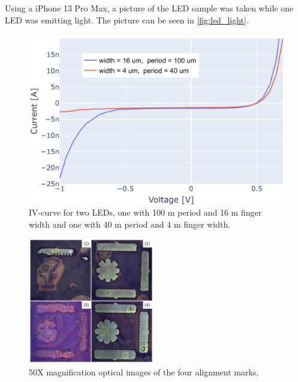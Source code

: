 Using a iPhone 13 Pro Max, a picture of the LED sample was taken while one LED was emitting light.
The picture can be seen in \autoref{fig:led_light}.


\begin{figure}
    \centering
    \includegraphics[width=\linewidth]{figures/LED_IV-curve_reverse.png}
    \caption{IV-curve for two LEDs, one with 100 \textmu m period and 16 \textmu m finger width and one with 40 \textmu m period and 4 \textmu m finger width.}
    \label{fig:iv_curve_reverse}
\end{figure}


\begin{figure}
    \centering
    \includegraphics[width=0.49\textwidth]{figures/align_marks.png}
    \caption{50X magnification optical images of the four alignment marks.}
    \label{fig:align_marks}
\end{figure}

